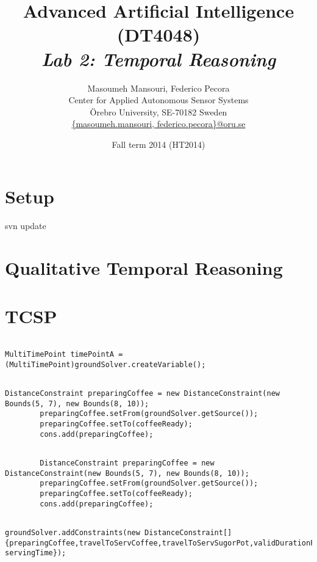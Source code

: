 \documentclass[a4paper]{article}
\title{Advanced Artificial Intelligence (DT4048)\\{\em Lab 2: Temporal Reasoning}}
\author{Masoumeh Mansouri, Federico Pecora\\Center for Applied Autonomous Sensor Systems\\\"Orebro University, SE-70182 Sweden\\\url{{masoumeh.mansouri, federico.pecora}@oru.se}}
\date{Fall term 2014 (HT2014)}
\begin{document}
\maketitle

\section{Setup}

svn update

\section{Qualitative Temporal Reasoning}

\section{TCSP}

\begin{lstlisting}

MultiTimePoint timePointA = (MultiTimePoint)groundSolver.createVariable();

\end{lstlisting}

\begin{lstlisting}

DistanceConstraint preparingCoffee = new DistanceConstraint(new Bounds(5, 7), new Bounds(8, 10));
		preparingCoffee.setFrom(groundSolver.getSource());
		preparingCoffee.setTo(coffeeReady);
		cons.add(preparingCoffee);

\end{lstlisting}


\begin{lstlisting}

		DistanceConstraint preparingCoffee = new DistanceConstraint(new Bounds(5, 7), new Bounds(8, 10));
		preparingCoffee.setFrom(groundSolver.getSource());
		preparingCoffee.setTo(coffeeReady);
		cons.add(preparingCoffee);

\end{lstlisting}

\begin{lstlisting}

groundSolver.addConstraints(new DistanceConstraint[] {preparingCoffee,travelToServCoffee,travelToServSugorPot,validDurationForHotCoffee, servingTime});

\end{lstlisting}
\end{document}
